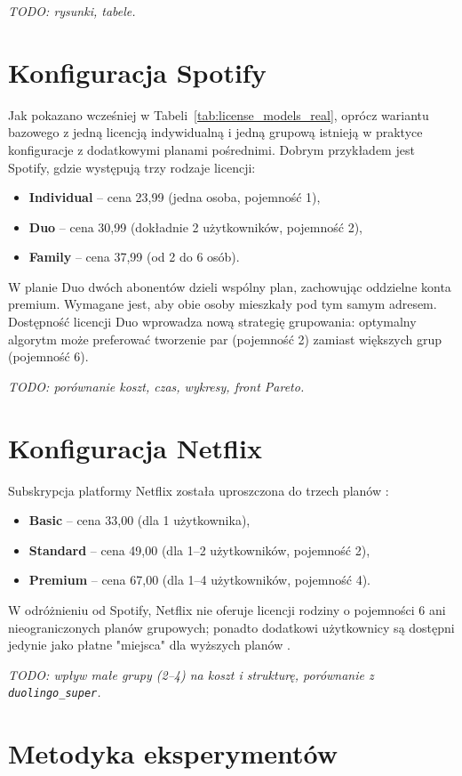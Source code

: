 \emph{TODO: rysunki, tabele.}

\section{Konfiguracja Spotify}

Jak pokazano wcześniej w Tabeli~\ref{tab:license_models_real}, oprócz wariantu bazowego z jedną licencją indywidualną i jedną grupową istnieją w praktyce konfiguracje z dodatkowymi planami pośrednimi. Dobrym przykładem jest Spotify, gdzie występują trzy rodzaje licencji:
\begin{itemize}
  \item \textbf{Individual} -- cena 23,99 (jedna osoba, pojemność 1),
  \item \textbf{Duo} -- cena 30,99 (dokładnie 2 użytkowników, pojemność 2),
  \item \textbf{Family} -- cena 37,99 (od 2 do 6 osób).
\end{itemize}

W planie Duo dwóch abonentów dzieli wspólny plan, zachowując oddzielne konta premium. Wymagane jest, aby obie osoby mieszkały pod tym samym adresem. Dostępność licencji Duo wprowadza nową strategię grupowania: optymalny algorytm może preferować tworzenie par (pojemność 2) zamiast większych grup (pojemność 6).

\emph{TODO: porównanie koszt, czas, wykresy, front Pareto.}

\section{Konfiguracja Netflix}

Subskrypcja platformy Netflix została uproszczona do trzech planów \cite{netflix_plans}:
\begin{itemize}
  \item \textbf{Basic} -- cena 33,00 (dla 1 użytkownika),
  \item \textbf{Standard} -- cena 49,00 (dla 1--2 użytkowników, pojemność 2),
  \item \textbf{Premium} -- cena 67,00 (dla 1--4 użytkowników, pojemność 4).
\end{itemize}

W odróżnieniu od Spotify, Netflix nie oferuje licencji rodziny o pojemności 6 ani nieograniczonych planów grupowych; ponadto dodatkowi użytkownicy są dostępni jedynie jako płatne "miejsca" dla wyższych planów \cite{netflix_plans}.

\emph{TODO: wpływ małe grupy (2--4) na koszt i strukturę, porównanie z \texttt{duolingo\_super}.}

\section{Metodyka eksperymentów}



